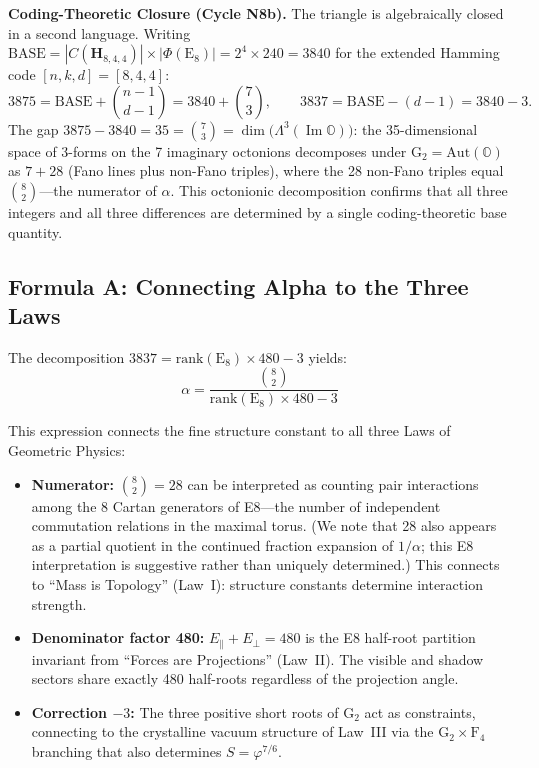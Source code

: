\documentclass[aps,prd,twocolumn,superscriptaddress,floatfix,nofootinbib]{revtex4-2}
\theoremstyle{definition}
\theoremstyle{remark}
\newcommand{\vp}{\varphi}
\begin{document}
\textbf{Coding-Theoretic Closure (Cycle N8b).}
The triangle is algebraically closed in a second language. Writing
$\text{BASE} = |C(\mathbf{H}_{8,4,4})| \times |\Phi(\text{E}_8)| = 2^4 \times 240 = 3840$
for the extended Hamming code $[n,k,d]=[8,4,4]$:
\begin{equation}
    3875 = \text{BASE} + \binom{n-1}{d-1} = 3840 + \binom{7}{3}, \qquad
    3837 = \text{BASE} - (d-1) = 3840 - 3.
\end{equation}
The gap $3875 - 3840 = 35 = \binom{7}{3} = \dim\bigl(\Lambda^3(\operatorname{Im}\mathbb{O})\bigr)$:
the 35-dimensional space of 3-forms on the 7 imaginary octonions decomposes under
$\text{G}_2 = \mathrm{Aut}(\mathbb{O})$ as $7 + 28$ (Fano lines plus non-Fano triples),
where the 28 non-Fano triples equal $\binom{8}{2}$---the numerator of $\alpha$.
This octonionic decomposition confirms that all three integers and all three
differences are determined by a single coding-theoretic base quantity.

\subsection{Formula A: Connecting Alpha to the Three Laws}

The decomposition $3837 = \text{rank}(\text{E}_8) \times 480 - 3$ yields:
\begin{equation}
    \alpha = \frac{\binom{8}{2}}{\text{rank}(\text{E}_8) \times 480 - 3}
\end{equation}

This expression connects the fine structure constant to all three Laws of
Geometric Physics:

\begin{itemize}
    \item \textbf{Numerator:} $\binom{8}{2} = 28$ can be interpreted as counting
    pair interactions among the 8 Cartan generators of E8---the number of
    independent commutation relations in the maximal torus. (We note that 28 also
    appears as a partial quotient in the continued fraction expansion of $1/\alpha$;
    this E8 interpretation is suggestive rather than uniquely determined.)
    This connects to ``Mass is Topology'' (Law~I): structure constants
    determine interaction strength.

    \item \textbf{Denominator factor 480:} $E_\parallel + E_\perp = 480$ is
    the E8 half-root partition invariant from ``Forces are Projections'' (Law~II).
    The visible and shadow sectors share exactly 480 half-roots regardless of
    the projection angle.

    \item \textbf{Correction $-3$:} The three positive short roots of G$_2$
    act as constraints, connecting to the crystalline vacuum structure of
    Law~III via the $\text{G}_2 \times \text{F}_4$ branching that also
    determines $S = \vp^{7/6}$.
\end{itemize}
\end{document}
